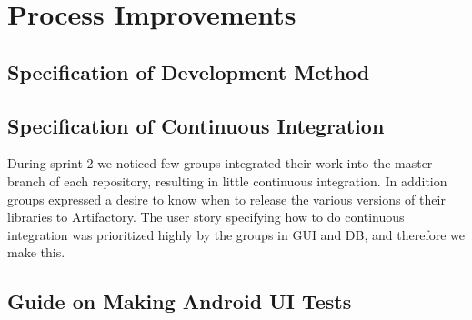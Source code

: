 \chapter{Process Improvements}
\dummy

\section{Specification of Development Method}
\dummy

\section{Specification of Continuous Integration}
During sprint 2 we noticed few groups integrated their work into the master branch of each repository, resulting in little continuous integration. In addition groups expressed a desire to know when to release the various versions of their libraries to Artifactory. The user story specifying how to do continuous integration was prioritized highly by the groups in GUI and DB, and therefore we make this.


\section{Guide on Making Android UI Tests}
\dummy
